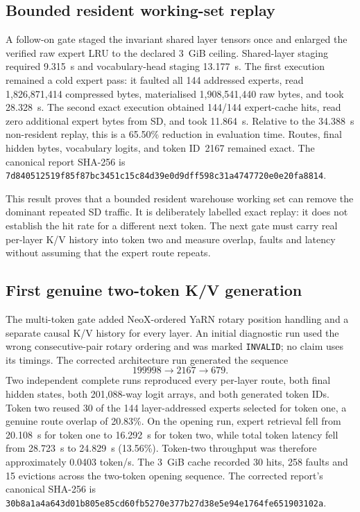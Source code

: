 \subsection{Bounded resident working-set replay}
A follow-on gate staged the invariant shared layer tensors once and enlarged the
verified raw expert LRU to the declared 3~GiB ceiling.  Shared-layer staging
required 9.315~s and vocabulary-head staging 13.177~s.  The first execution
remained a cold expert pass: it faulted all 144 addressed experts, read
1,826,871,414 compressed bytes, materialised 1,908,541,440 raw bytes, and took
28.328~s.  The second exact execution obtained 144/144 expert-cache hits, read
zero additional expert bytes from SD, and took 11.864~s.  Relative to the
34.388~s non-resident replay, this is a 65.50\% reduction in evaluation time.
Routes, final hidden bytes, vocabulary logits, and token ID~2167 remained exact.
The canonical report SHA-256 is
\texttt{7d840512519f85f87bc3451c15c84d39e0d9dff598c31a4747720e0e20fa8814}.

This result proves that a bounded resident warehouse working set can remove the
dominant repeated SD traffic.  It is deliberately labelled exact replay: it
does not establish the hit rate for a different next token.  The next gate must
carry real per-layer K/V history into token two and measure overlap, faults and
latency without assuming that the expert route repeats.

\subsection{First genuine two-token K/V generation}
The multi-token gate added NeoX-ordered YaRN rotary position handling and a
separate causal K/V history for every layer.  An initial diagnostic run used
the wrong consecutive-pair rotary ordering and was marked \texttt{INVALID}; no
claim uses its timings.  The corrected architecture run generated the sequence
\[
  199998 \longrightarrow 2167 \longrightarrow 679.
\]
Two independent complete runs reproduced every per-layer route, both final
hidden states, both 201,088-way logit arrays, and both generated token IDs.
Token two reused 30 of the 144 layer-addressed experts selected for token one,
a genuine route overlap of 20.83\%.  On the opening run, expert retrieval fell
from 20.108~s for token one to 16.292~s for token two, while total token latency
fell from 28.723~s to 24.829~s (13.56\%).  Token-two throughput was therefore
approximately 0.0403 token/s.  The 3~GiB cache recorded 30 hits, 258 faults and
15 evictions across the two-token opening sequence.  The corrected report's
canonical SHA-256 is
\texttt{30b8a1a4a643d01b805e85cd60fb5270e377b27d38e5e94e1764fe651903102a}.

